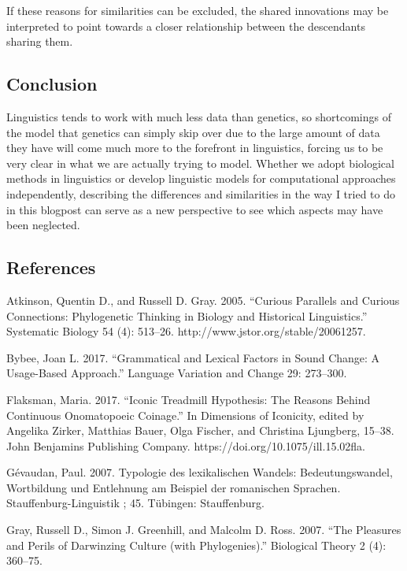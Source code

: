 \documentclass[
  a4paper,
  14pt,
  oneside,
  tablecaptionabove
]{scrbook}
\begin{document}
If these reasons for similarities can be excluded, the shared innovations may be interpreted to point towards a closer relationship between the descendants sharing them.

\subsection*{Conclusion}

Linguistics tends to work with much less data than genetics, so shortcomings of the model that genetics can simply skip over due to the large amount of data they have will come much more to the forefront in linguistics, forcing us to be very clear in what we are actually trying to model. Whether we adopt biological methods in linguistics or develop linguistic models for computational approaches independently, describing the differences and similarities in the way I tried to do in this blogpost can serve as a new perspective to see which aspects may have been neglected.

\subsection*{References}


\nopagebreak\hangindent=0.7cm {\small
Atkinson, Quentin D., and Russell D. Gray. 2005. “Curious Parallels and Curious Connections: Phylogenetic Thinking in Biology and Historical Linguistics.” Systematic Biology 54 (4): 513–26. http://www.jstor.org/stable/20061257.
}

\nopagebreak\hangindent=0.7cm {\small
Bybee, Joan L. 2017. “Grammatical and Lexical Factors in Sound Change: A Usage-Based Approach.” Language Variation and Change 29: 273–300.
}

\nopagebreak\hangindent=0.7cm {\small
Flaksman, Maria. 2017. “Iconic Treadmill Hypothesis: The Reasons Behind Continuous Onomatopoeic Coinage.” In Dimensions of Iconicity, edited by Angelika Zirker, Matthias Bauer, Olga Fischer, and Christina Ljungberg, 15–38. John Benjamins Publishing Company. https://doi.org/10.1075/ill.15.02fla.
}

\nopagebreak\hangindent=0.7cm {\small
Gévaudan, Paul. 2007. Typologie des lexikalischen Wandels: Bedeutungswandel, Wortbildung und Entlehnung am Beispiel der romanischen Sprachen. Stauffenburg-Linguistik ; 45. Tübingen: Stauffenburg.
}

\nopagebreak\hangindent=0.7cm {\small
Gray, Russell D., Simon J. Greenhill, and Malcolm D. Ross. 2007. “The Pleasures and Perils of Darwinzing Culture (with Phylogenies).” Biological Theory 2 (4): 360–75.
}
\end{document}
